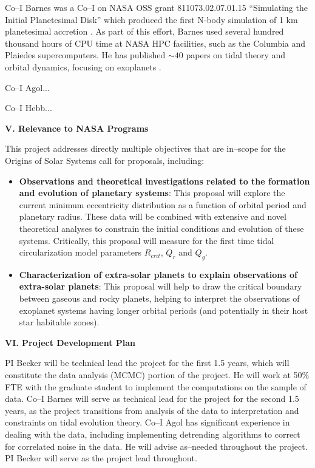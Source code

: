 Co--I Barnes was a Co--I on NASA OSS grant 811073.02.07.01.15
``Simulating the Initial Planetesimal Disk'' which produced the first
N-body simulation of 1 km planetesimal accretion
\citep{Barnes09_1km}. As part of this effort, Barnes used several hundred thousand hours of CPU time at NASA HPC facilities, such as the Columbia and Plaiedes supercomputers. He has published $\sim 40$ papers on tidal theory and orbital dynamics, focusing on exoplanets
\citep[e.g.][]{BarnesQuinn01,BarnesRaymond04,BarnesGreenberg06a,Barnes11,Barnes13}. 

Co--I Agol...

Co--I Hebb...

\bigskip
\centerline{\bf V. Relevance to NASA Programs}
\smallskip

This project addresses directly multiple objectives that are in--scope
for the Origins of Solar Systems call for proposals, including:
\begin{itemize}

\item {\bf Observations and theoretical investigations related to the formation 
  and evolution of planetary systems}: This proposal will explore the
  current minimum eccentricity distribution as a function of orbital
  period and planetary radius.  These data will be combined with
  extensive and novel theoretical analyses to constrain the initial
  conditions and evolution of these systems.  Critically, this
  proposal will measure for the first time tidal circularization model
  parameters $R_{crit}$, $Q_{r}$ and $Q_{g}$.

\item {\bf Characterization of extra-solar planets to explain
  observations of extra-solar planets}: This proposal will help to
  draw the critical boundary between gaseous and rocky planets,
  helping to interpret the observations of exoplanet systems having
  longer orbital periods (and potentially in their host star habitable
  zones).

\end{itemize}

\bigskip
\centerline{\bf VI. Project Development Plan}
\smallskip

PI Becker will be technical lead the project for the first 1.5 years,
which will constitute the data analysis (MCMC) portion of the project.
He will work at 50\% FTE with the graduate student to implement the
computations on the \kepler sample of data.  Co--I Barnes will serve as
technical lead for the project for the second 1.5 years, as the
project transitions from analysis of the data to interpretation and
constraints on tidal evolution theory.  Co--I Agol has significant
experience in dealing with the \kepler data, including implementing
detrending algorithms to correct for correlated noise in the \kepler
data.  He will advise as--needed throughout the project.  PI Becker
will serve as the project lead throughout.


